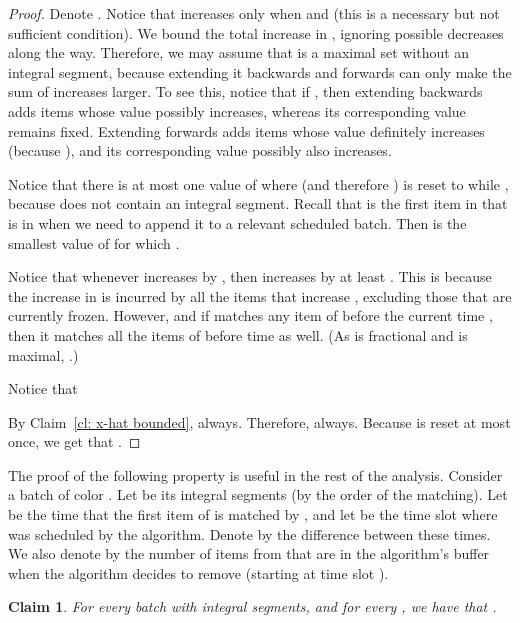 \documentclass[12pt]{article}
\newtheorem{claim}[theorem]{Claim}
\begin{document}
\begin{proof}
Denote . Notice that  increases only when 
and  (this is a necessary but not sufficient condition). We bound
the total increase in , ignoring possible decreases along the
way. Therefore, we may assume that  is a maximal set without an
integral segment, because extending it backwards and forwards can only
make the sum of increases larger. To see this, notice that if , then
extending  backwards adds items whose  value possibly
increases, whereas its corresponding  value remains fixed.
Extending  forwards adds items whose  value definitely
increases (because ), and its corresponding  value
possibly also increases.

Notice that there is at most one value  of  
where 
(and therefore ) is reset to  while , 
because  does not contain
an integral segment. Recall that  is the first
item in  that is in  when we need to append it to a relevant 
scheduled batch. Then  is the smallest value of  for which
.

Notice that whenever 
increases by , then  increases by at least
. This is because the increase in 
is incurred by all the items that increase , excluding those that
are currently frozen. However,  and
if  matches any item of  before the current time , then it
matches all the items of  before time  as well. (As 
is fractional and  is maximal, .)

Notice that

By Claim~\ref{cl: x-hat bounded},  always.
Therefore,  always. Because
 is reset at most once, we get that 
.
\end{proof}

The proof of the following property is useful
in the rest of the analysis.
Consider a batch  of color .  
Let  be its integral segments
(by the order of the matching).
Let  be the time that the first item of  is matched by ,
and let  be the time slot where  was scheduled by the algorithm.
Denote by   the difference between these times.
We also denote by  the number of items from 
that are in the algorithm's buffer when the algorithm decides to
remove  (starting at time slot ).

\begin{claim}\label{cl: delta_p}
For every batch  with  integral segments, and
for every , we have that .
\end{claim}
\end{document}
